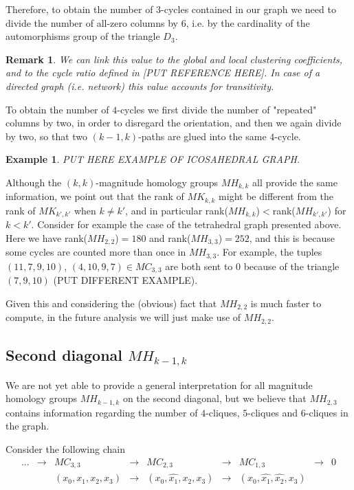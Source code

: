 \documentclass{article}
\newtheorem{remark}[theorem]{Remark}
\newtheorem{example}[theorem]{Example}
\begin{document}
	Therefore, to obtain the number of $3$-cycles contained in our graph we need to divide the number of all-zero columns by $6$, i.e. by the cardinality of the automorphisms group of the triangle $D_3$.
	
	\begin{remark}
		We can link this value to the global and local clustering coefficients, and to the cycle ratio defined in [PUT REFERENCE HERE].
		In case of a directed graph (i.e. network) this value accounts for transitivity.
	\end{remark}
	
	To obtain the number of $4$-cycles we first divide the number of "repeated" columns by two, in order to disregard the orientation, and then we again divide by two, so that two $(k-1,k)$-paths are glued into the same $4$-cycle.
	
	\begin{example}
		PUT HERE EXAMPLE OF ICOSAHEDRAL GRAPH.
	\end{example}
	
	Although the $(k,k)$-magnitude homology groups $MH_{k,k}$ all provide the same information, we point out that the rank of $MK_{k,k}$ might be different from the rank of $MK_{k',k'}$ when $k \neq k'$, and in particular rank($MH_{k,k}$)$<$rank($MH_{k',k'}$) for $k<k'$. 
	Consider for example the case of the tetrahedral graph presented above.
	Here we have rank($MH_{2,2}$)$=180$ and rank($MH_{3,3}$)$=252$, and this is because some cycles are counted more than once in $MH_{3,3}$.
	For example, the tuples $(11,7,9,10)$, $(4,10,9,7) \in MC_{3,3}$ are both sent to $0$ because of the triangle $(7,9,10)$ (PUT DIFFERENT EXAMPLE).
	
	Given this and considering the (obvious) fact that $MH_{2,2}$ is much faster to compute, in the future analysis we will just make use of $MH_{2,2}$.
	
	\subsection{Second diagonal $MH_{k-1,k}$}
	We are not yet able to provide a general interpretation for all magnitude homology groups $MH_{k-1,k}$ on the second diagonal, but we believe that $MH_{2,3}$ contains information regarding the number of $4$-cliques, $5$-cliques and $6$-cliques in the graph.
	
	Consider the following chain
	\begin{equation*}
		\begin{matrix}
			... &\to & MC_{3,3}          &\to & MC_{2,3}                &\to & MC_{1,3} &\to & 0 \\
			&    & (x_0,x_1,x_2,x_3) &\to & (x_0,\hat{x_1},x_2,x_3) &\to & (x_0,\hat{x_1},\hat{x_2},x_3) & &
		\end{matrix}
	\end{equation*}
	
\end{document}
